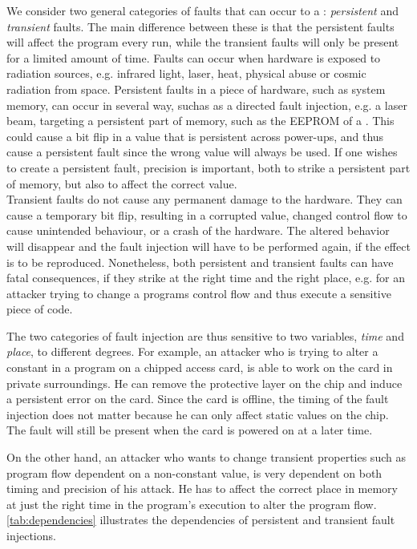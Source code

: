 We consider two general categories of faults that can occur to a \jc: \textit{persistent} and \textit{transient} faults. The main difference between these is that the persistent faults will affect the program every run, while the transient faults will only be present for a limited amount of time. Faults can occur when hardware is exposed to radiation sources, e.g. infrared light, laser, heat, physical abuse or cosmic radiation from space. 
Persistent faults in a piece of hardware, such as system memory, can occur in several way, suchas as a directed fault injection, e.g. a laser beam, targeting a persistent part of memory, such as the EEPROM of a \jc. This could cause a bit flip in a value that is persistent across power-ups, and thus cause a persistent fault since the wrong value will always be used. If one wishes to create a persistent fault, precision is important, both to strike a persistent part of memory, but also to affect the correct value.\\


Transient faults do not cause any permanent damage to the hardware. They can cause a temporary bit flip, resulting in a corrupted value, changed control flow to cause unintended behaviour, or a crash of the hardware. The altered behavior will disappear and the fault injection will have to be performed again, if the effect is to be reproduced.
Nonetheless, both persistent and transient faults can have fatal consequences, if they strike at the right time and the right place, e.g. for an attacker trying to change a programs control flow and thus execute a sensitive piece of code. 

The two categories of fault injection are thus sensitive to two variables, \textit{time} and \textit{place}, to different degrees. For example, an attacker who is trying to alter a constant in a program on a chipped access card, is able to work on the card in private surroundings. He can remove the protective layer on the chip and induce a persistent error on the card. Since the card is offline, the timing of the fault injection does not matter because he can only affect static values on the chip. The fault will still be present when the card is powered on at a later time. 

On the other hand, an attacker who wants to change transient properties such as program flow dependent on a non-constant value, is very dependent on both timing and precision of his attack. He has to affect the correct place in memory at just the right time in the program's execution to alter the program flow. \cref{tab:dependencies} illustrates the dependencies of persistent and transient fault injections.

